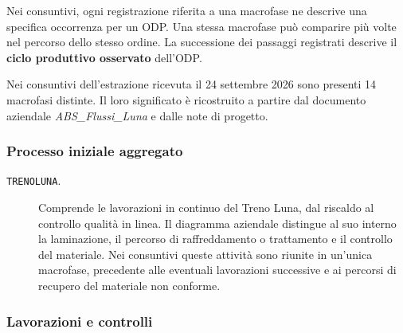 Nei consuntivi, ogni registrazione riferita a una macrofase ne descrive una specifica occorrenza per un ODP. Una stessa macrofase può comparire più volte nel percorso dello stesso ordine. La successione dei passaggi registrati descrive il \textbf{ciclo produttivo osservato} dell'ODP.

Nei consuntivi dell'estrazione ricevuta il 24 settembre 2026 sono presenti 14 macrofasi distinte. Il loro significato è ricostruito a partire dal documento aziendale \emph{ABS\_Flussi\_Luna} e dalle note di progetto.

\subsubsection{Processo iniziale aggregato}

\begin{description}
\item[\texttt{TRENOLUNA}.] Comprende le lavorazioni in continuo del Treno Luna, dal riscaldo al controllo qualità in linea. Il diagramma aziendale distingue al suo interno la laminazione, il percorso di raffreddamento o trattamento e il controllo del materiale. Nei consuntivi queste attività sono riunite in un'unica macrofase, precedente alle eventuali lavorazioni successive e ai percorsi di recupero del materiale non conforme.
\end{description}

\subsubsection{Lavorazioni e controlli}


